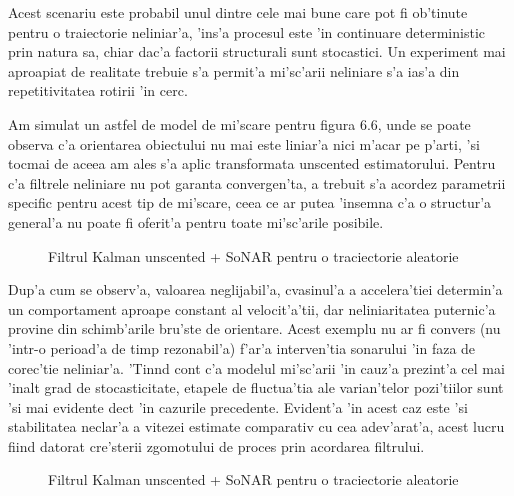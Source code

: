 \documentclass[12pt,a4paper,twoside]{report}
\begin{document}
\vspace{5px}

Acest scenariu este probabil unul dintre cele mai bune care pot fi ob'tinute pentru o traiectorie neliniar'a, 'ins'a procesul este 'in continuare deterministic prin natura sa, chiar dac'a factorii structurali sunt stocastici. Un experiment mai aproapiat de realitate trebuie s'a permit'a mi'sc'arii neliniare s'a ias'a din repetitivitatea rotirii 'in cerc. 

\vspace{5px}

Am simulat un astfel de model de mi'scare pentru figura 6.6, unde se poate observa c'a orientarea obiectului nu mai este liniar'a nici m'acar pe p'arti, 'si tocmai de aceea am ales s'a aplic transformata unscented estimatorului. Pentru c'a filtrele neliniare nu pot garanta convergen'ta, a trebuit s'a acordez parametrii specific pentru acest tip de mi'scare, ceea ce ar putea 'insemna c'a o structur'a general'a nu poate fi oferit'a pentru toate mi'sc'arile posibile. 

\begin{figure}[h]
\hspace*{-5cm}
 
 \caption{Filtrul Kalman unscented + SoNAR pentru o traciectorie aleatorie
 }
\end{figure}

Dup'a cum se observ'a, valoarea neglijabil'a, cvasinul'a a accelera'tiei determin'a un comportament aproape constant al velocit'a'tii, dar neliniaritatea puternic'a provine din schimb'arile bru'ste de orientare. Acest exemplu nu ar fi convers (nu 'intr-o perioad'a de timp rezonabil'a) f'ar'a interven'tia sonarului 'in faza de corec'tie neliniar'a. 'Tin\ia nd cont c'a modelul mi'sc'arii 'in cauz'a prezint'a cel mai 'inalt grad de stocasticitate, etapele de fluctua'tia ale varian'telor pozi'tiilor sunt 'si mai evidente dec\ia t 'in cazurile precedente. Evident'a 'in acest caz este 'si stabilitatea neclar'a a vitezei estimate comparativ cu cea adev'arat'a, acest lucru fiind datorat cre'sterii zgomotului de proces prin acordarea filtrului.

\begin{figure}[h]
\hspace*{-5cm}
 
 \caption{Filtrul Kalman unscented + SoNAR  pentru o traciectorie aleatorie
 }
\end{figure}
\end{document}
